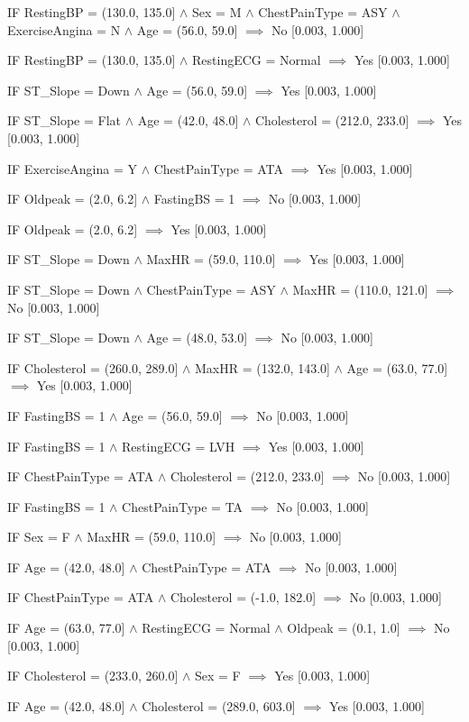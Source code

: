 IF RestingBP = (130.0, 135.0] $\land$ Sex = M $\land$ ChestPainType = ASY $\land$ ExerciseAngina = N $\land$ Age = (56.0, 59.0] $\implies$ No [0.003, 1.000]

IF RestingBP = (130.0, 135.0] $\land$ RestingECG = Normal $\implies$ Yes [0.003, 1.000]

IF ST_Slope = Down $\land$ Age = (56.0, 59.0] $\implies$ Yes [0.003, 1.000]

IF ST_Slope = Flat $\land$ Age = (42.0, 48.0] $\land$ Cholesterol = (212.0, 233.0] $\implies$ Yes [0.003, 1.000]

IF ExerciseAngina = Y $\land$ ChestPainType = ATA $\implies$ Yes [0.003, 1.000]

IF Oldpeak = (2.0, 6.2] $\land$ FastingBS = 1 $\implies$ No [0.003, 1.000]

IF Oldpeak = (2.0, 6.2] $\implies$ Yes [0.003, 1.000]

IF ST_Slope = Down $\land$ MaxHR = (59.0, 110.0] $\implies$ Yes [0.003, 1.000]

IF ST_Slope = Down $\land$ ChestPainType = ASY $\land$ MaxHR = (110.0, 121.0] $\implies$ No [0.003, 1.000]

IF ST_Slope = Down $\land$ Age = (48.0, 53.0] $\implies$ No [0.003, 1.000]

IF Cholesterol = (260.0, 289.0] $\land$ MaxHR = (132.0, 143.0] $\land$ Age = (63.0, 77.0] $\implies$ Yes [0.003, 1.000]

IF FastingBS = 1 $\land$ Age = (56.0, 59.0] $\implies$ No [0.003, 1.000]

IF FastingBS = 1 $\land$ RestingECG = LVH $\implies$ Yes [0.003, 1.000]

IF ChestPainType = ATA $\land$ Cholesterol = (212.0, 233.0] $\implies$ No [0.003, 1.000]

IF FastingBS = 1 $\land$ ChestPainType = TA $\implies$ No [0.003, 1.000]

IF Sex = F $\land$ MaxHR = (59.0, 110.0] $\implies$ No [0.003, 1.000]

IF Age = (42.0, 48.0] $\land$ ChestPainType = ATA $\implies$ No [0.003, 1.000]

IF ChestPainType = ATA $\land$ Cholesterol = (-1.0, 182.0] $\implies$ No [0.003, 1.000]

IF Age = (63.0, 77.0] $\land$ RestingECG = Normal $\land$ Oldpeak = (0.1, 1.0] $\implies$ No [0.003, 1.000]

IF Cholesterol = (233.0, 260.0] $\land$ Sex = F $\implies$ Yes [0.003, 1.000]

IF Age = (42.0, 48.0] $\land$ Cholesterol = (289.0, 603.0] $\implies$ Yes [0.003, 1.000]

